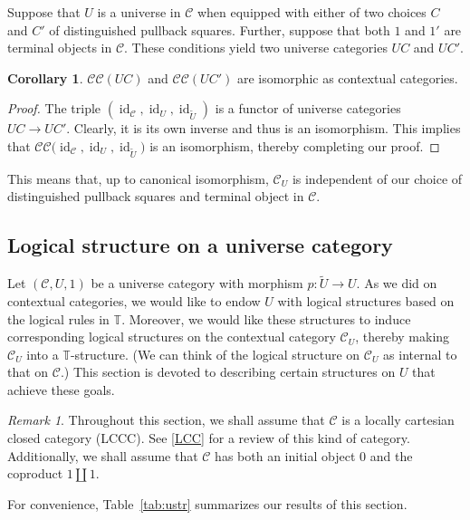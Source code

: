 \documentclass[10pt,letterpaper,cm]{nupset}
\theoremstyle{definition}
\theoremstyle{theorem}
\newtheorem{corollary}[definition]{Corollary}
\theoremstyle{remark}
\newtheorem{remark}[definition]{Remark}
\newcommand{\0}{\mathbf{0}}
\newcommand{\1}{\mathbf{1}}
\newcommand{\2}{\mathbf{2}}
\renewcommand{\c}{\mathscr{C}}
\newcommand{\T}{\mathbb T}
\DeclareMathOperator{\idd}{id}
\begin{document}
Suppose that $U$ is a universe in $\c$ when equipped with either of two choices $C$ and $C'$ of distinguished pullback squares. Further, suppose that both $1$ and $1'$ are terminal objects in $\c$. These conditions yield two universe categories $\mathit{UC}$ and $\mathit{UC}'$.

\begin{corollary}
 $\mathcal{CC}(\mathit{UC})$ and  $\mathcal{CC}(\mathit{UC}')$ are isomorphic as contextual categories.
\end{corollary}
\begin{proof}
The triple $\left(\idd_{\c}, \idd_U, \idd_{\tilde{U}}\right)$ is a functor of universe categories $\mathit{UC} \to \mathit{UC}'$. Clearly, it is its own inverse and thus is an isomorphism. This implies that $\mathcal{CC}\big(\idd_{\c}, \idd_U, \idd_{\tilde{U}}\big)$ is an isomorphism, thereby completing our proof.
\end{proof}

This means that, up to canonical isomorphism, $\c_{U}$ is independent of our choice of distinguished pullback squares and terminal  object in $\c$.

\subsection{Logical structure on a universe category}\label{log}

Let $\left(\c, U, 1\right)$ be a universe category with morphism $p: \tilde{U} \to U$. As we did on contextual categories, we would like to endow $U$ with logical structures  based on the logical rules in $\T$. Moreover, we would like these structures to induce corresponding logical structures on the contextual category $\c_U$, thereby making $\c_U$ into a $\T$-structure. (We can think of the logical structure on $\c_U$ as internal to that on $\c$.)  This section is devoted to describing certain structures on $U$ that achieve these goals.

\smallskip

\begin{remark}
Throughout this section, we shall assume that $\c$ is a locally cartesian closed category (LCCC). See \cref{LCC} for a review of this kind of category. Additionally, we shall assume that $\c$ has both an initial object $0$ and the coproduct $1\coprod 1$.
\end{remark}

\smallskip

For convenience, Table~\ref{tab:ustr} summarizes our results of this section. 
\end{document}
